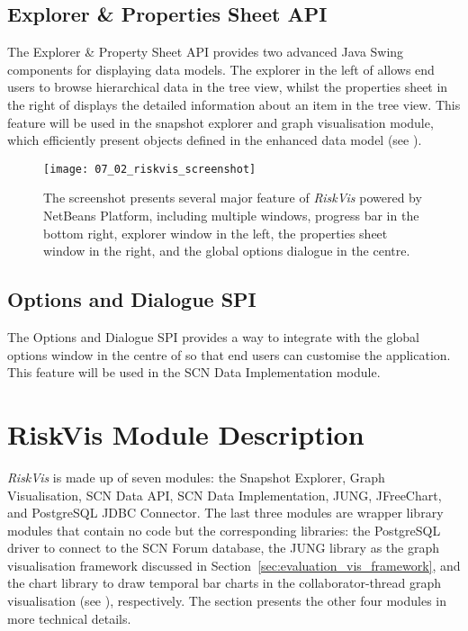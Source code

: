 \subsection{Explorer \& Properties Sheet API}

The Explorer \& Property Sheet API provides two advanced Java Swing components for displaying data models. The explorer in the left of  allows end users to browse hierarchical data in the tree view, whilst the properties sheet in the right of  displays the detailed information about an item in the tree view. This feature will be used in the snapshot explorer and graph visualisation module, which efficiently present objects defined in the enhanced data model (see ).

\begin{figure}[!htb]
  \centering
  \texttt{[image: 07\_02\_riskvis\_screenshot]}
  \caption{The screenshot presents several major feature of \emph{RiskVis} powered by NetBeans Platform, including multiple windows, progress bar in the bottom right, explorer window in the left, the properties sheet window in the right, and the global options dialogue in the centre.}
  \label{Figure:07_02}
\end{figure}

\subsection{Options and Dialogue SPI}
The Options and Dialogue SPI provides a way to integrate with the global options window in the centre of  so that end users can customise the application. This feature will be used in the SCN Data Implementation module.

\section{RiskVis Module Description} \label{sec:riskvis_module_desc}

\emph{RiskVis} is made up of seven modules: the Snapshot Explorer, Graph Visualisation, SCN Data API, SCN Data Implementation, JUNG, JFreeChart, and PostgreSQL JDBC Connector. The last three modules are wrapper library modules that contain no code but the corresponding libraries: the PostgreSQL driver to connect to the SCN Forum database, the JUNG library as the graph visualisation framework discussed in Section~\ref{sec:evaluation_vis_framework}, and the chart library to draw temporal bar charts in the collaborator-thread graph visualisation (see ), respectively. The section presents the other four modules in more technical details.


